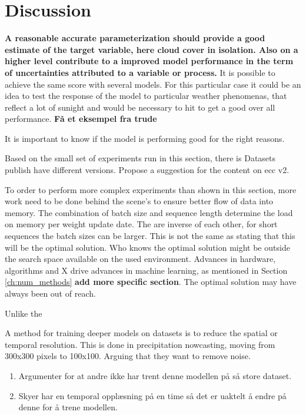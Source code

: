 \chapter{Discussion}

\textbf{A reasonable accurate parameterization should provide a good estimate of the target variable, here cloud cover in isolation. Also on a higher level contribute to a improved model performance in the term of uncertainties attributed to a variable or process.}  It is possible to achieve the same score with several  models. For this particular case it could be an idea to test the response of the model to particular weather phenomenas, that reflect a lot of sunight and would be necessary to hit to get a good over all performance. \textbf{Få et eksempel fra trude} 

It is important to know if the model is performing good for the right reasons.

Based on the small set of experiments run in this section, there is 
Datasets publish have different versions. Propose a suggestion for the content on \acrshort{ecc} v2.

To order to perform more complex experiments than shown in this section, more work need to be done behind the scene's to ensure better flow of data into memory. The combination of batch size and sequence length determine the load on memory per weight update date. The are inverse of each other, for short sequences the batch sizes can be larger. This is not the same as stating that this will be the optimal solution. Who knows the optimal solution might be outside the search space available on the used environment. Advances in hardware, algorithms and X drive advances in machine learning, as mentioned in Section \ref{ch:num_methods} \textbf{add more specific section}. The optimal solution may have always been out of reach. 

Unlike the \cite{}

A method for training deeper models on datasets is to reduce the spatial or temporal resolution. This is done in precipitation nowcasting, moving from 300x300 pixels to 100x100. Arguing that they want to remove noise.

\begin{enumerate}
    \item Argumenter for at andre ikke har trent denne modellen på så store dataset. 
    \item Skyer har en temporal opplæsning på en time så det er uaktelt å endre på denne for å trene modellen. 
\end{enumerate}
